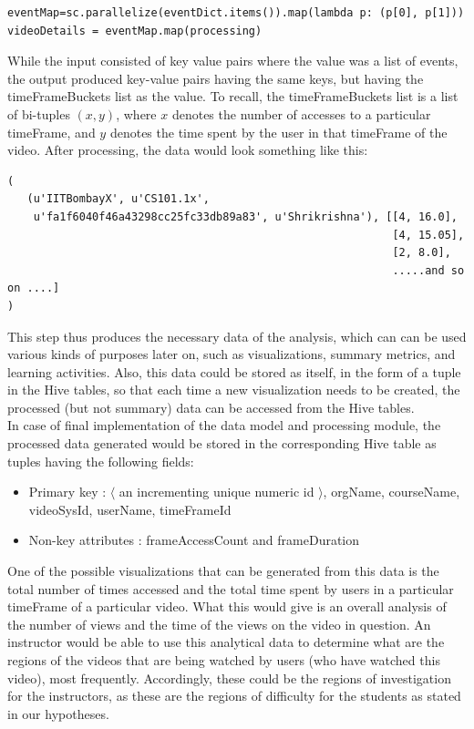 \documentclass[16pt]{report}
\begin{document}
\begin{verbatim}
eventMap=sc.parallelize(eventDict.items()).map(lambda p: (p[0], p[1]))
videoDetails = eventMap.map(processing)
\end{verbatim}

While the input consisted of key value pairs where the value was a list of events, the output produced key-value pairs having the same keys, but having the timeFrameBuckets list as the value. To recall, the timeFrameBuckets list is a list of bi-tuples $(x,y)$, where $x$ denotes the number of accesses to a particular timeFrame, and $y$ denotes the time spent by the user in that timeFrame of the video. After processing, the data would look something like this:

\begin{verbatim}
(
   (u'IITBombayX', u'CS101.1x',
    u'fa1f6040f46a43298cc25fc33db89a83', u'Shrikrishna'), [[4, 16.0], 
                                                           [4, 15.05], 
                                                           [2, 8.0], 
                                                           .....and so on ....]
)
\end{verbatim}

This step thus produces the necessary data of the analysis, which can can be used various kinds of purposes later on, such as visualizations, summary metrics, and learning activities. Also, this data could be stored as itself, in the form of a tuple in the Hive tables, so that each time a new visualization needs to be created, the processed (but not summary) data can be accessed from the Hive tables. \\

In case of final implementation of the data model and processing module, the processed data generated would be stored in the corresponding Hive table as tuples having the following fields:

\begin{itemize}

\item Primary key : $\langle$ an incrementing unique numeric id $\rangle$, orgName, courseName, videoSysId, userName, timeFrameId
\item Non-key attributes : frameAccessCount and frameDuration

\end{itemize}

One of the possible visualizations that can be generated from this data is the total number of times accessed and the total time spent by users in a particular timeFrame of a particular video. What this would give is an overall analysis of the number of views and the time of the views on the video in question. An instructor would be able to use this analytical data to determine what are the regions of the videos that are being watched by users (who have watched this video), most frequently. Accordingly, these could be the regions of investigation for the instructors, as these are the regions of difficulty for the students as stated in our hypotheses.\\
\end{document}
